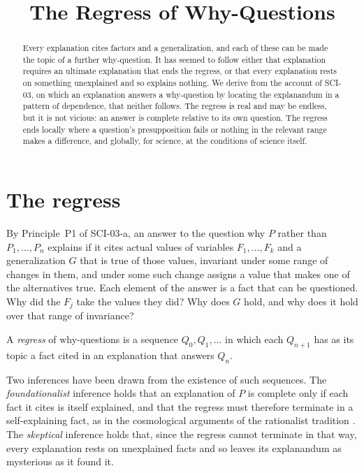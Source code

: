 \documentclass{situationist-preprint}
\title{The Regress of Why-Questions}
\begin{document}
\maketitle

\begin{abstract}
Every explanation cites factors and a generalization, and each of these can be made the topic of a further why-question. It has seemed to follow either that explanation requires an ultimate explanation that ends the regress, or that every explanation rests on something unexplained and so explains nothing. We derive from the account of SCI-03, on which an explanation answers a why-question by locating the explanandum in a pattern of dependence, that neither follows. The regress is real and may be endless, but it is not vicious: an answer is complete relative to its own question. The regress ends locally where a question's presupposition fails or nothing in the relevant range makes a difference, and globally, for science, at the conditions of science itself.
\end{abstract}

\section{The regress}\label{s:regress}

By Principle~P1 of SCI-03-a, an answer to the question why $P$ rather than $P_1, \dots, P_n$ explains if it cites actual values of variables $F_1, \dots, F_k$ and a generalization $G$ that is true of those values, invariant under some range of changes in them, and under some such change assigns a value that makes one of the alternatives true. Each element of the answer is a fact that can be questioned. Why did the $F_j$ take the values they did? Why does $G$ hold, and why does it hold over that range of invariance?

\begin{definition}[Regress]\label{d:regress}
A \emph{regress} of why-questions is a sequence $Q_0, Q_1, \dots$ in which each $Q_{n+1}$ has as its topic a fact cited in an explanation that answers $Q_n$.
\end{definition}

Two inferences have been drawn from the existence of such sequences. The \emph{foundationalist} inference holds that an explanation of $P$ is complete only if each fact it cites is itself explained, and that the regress must therefore terminate in a self-explaining fact, as in the cosmological arguments of the rationalist tradition \citep[§§32--38]{Leibniz1714}. The \emph{skeptical} inference holds that, since the regress cannot terminate in that way, every explanation rests on unexplained facts and so leaves its explanandum as mysterious as it found it.
\end{document}
